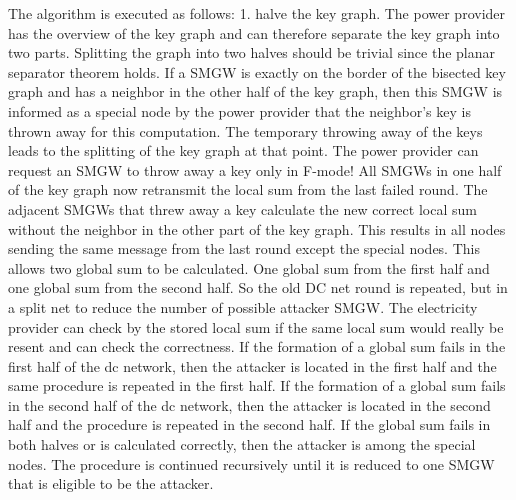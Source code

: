 The algorithm is executed as follows:
1. halve the key graph. 
The power provider has the overview of the key graph and can therefore separate the key graph into two parts. Splitting the graph into two halves should be trivial since the planar separator theorem holds.
If a SMGW is exactly on the border of the bisected key graph and has a neighbor in the other half of the key graph, then this SMGW is informed as a special node by the power provider that the neighbor's key is thrown away for this computation. The temporary throwing away of the keys leads to the splitting of the key graph at that point. The power provider can request an SMGW to throw away a key only in F-mode! All SMGWs in one half of the key graph now retransmit the local sum from the last failed round. The adjacent SMGWs that threw away a key calculate the new correct local sum without the neighbor in the other part of the key graph. This results in all nodes sending the same message from the last round except the special nodes. This allows two global sum to be calculated. One global sum from the first half and one global sum from the second half. So the old DC net round is repeated, but in a split net to reduce the number of possible attacker SMGW. The electricity provider can check by the stored local sum if the same local sum would really be resent and can check the correctness. 
If the formation of a global sum fails in the first half of the dc network, then the attacker is located in the first half and the same procedure is repeated in the first half. If the formation of a global sum fails in the second half of the dc network, then the attacker is located in the second half and the procedure is repeated in the second half. 
If the global sum fails in both halves or is calculated correctly, then the attacker is among the special nodes.
The procedure is continued recursively until it is reduced to one SMGW that is eligible to be the attacker. 

